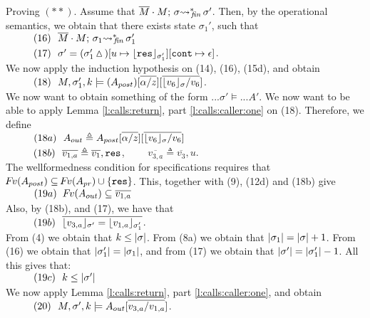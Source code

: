 \begin{description}
 \vspace{.3cm}
Proving $(**)$. Assume that   $\leadstoBoundedStarFin  {\Mtwo\cdot M}  {\sigma}  {\sigma'}$. Then, by the operational semantics, we obtain that 
there exists state $\sigma_1'$, such that \\
$\SPS (16) \ \ \leadstoBoundedStarFin  {\Mtwo\cdot M}  {\sigma_1}  {\sigma_1'}$ \\
$\SPS (17) \ \ \sigma'=(\sigma_1'\popSymbol)[u \mapsto {\interpret {\sigma_1'} {\prg{res}}}][\prg{cont}\mapsto \epsilon]$.
\\
We now apply the induction hypothesis on (14), (16), (15d), and obtain
\\ 
$\SPS (18) \ \  \satDAssertFrom M  {\sigma_1'} {k}   {(A_{post})[\overline{\alpha/z}][\overline{\interpret {\sigma} {v_6} /v_6}]}$.
\\
We now want to obtain something of the form $...\sigma' \models ...A'$. We now want to be able to apply   Lemma \ref{l:calls:return},  part \ref{l:calls:caller:one} on (18). Therefore, we  define
\\
$\SPS (18a) \ \  \Aout \triangleq  A_{post}[\overline{\alpha/z}][\overline{\interpret {\sigma} {v_6} /v_6}]$
\\
$\SPS (18b) \ \  \overline {v_{1,a}} \triangleq  \overline {v_1}, \prg{res}$,   \ \ \ \ 
$\overline {v_{3,a}} \triangleq  \overline {v_3}, u$.
\\
The wellformedness condition for specifications requires that $\fv (A_{post}) \subseteq  \fv (\Aop) \cup \{ \prg{res} \}$. 
This, together with  (9), (12d) and (18b) give  \\
$\SPS (19a) \ \  \fv(\Aout) \subseteq  \overline {v_{1,a}}$
\\
Also, by (18b), and (17), we have that   
\\
$\SPS (19b) \ \ \overline {\interpret {\sigma'} {v_{3,a}}  =  \interpret {\sigma_1'} {v_{1,a}} }$.
\\
From (4) we obtain that  $ k \leq \DepthSt {\sigma}$. From  (8a) we obtain that $ \DepthSt {\sigma_1} = \DepthSt {\sigma} +1$. From (16) we obtain that  $ \DepthSt {\sigma_1'} = \DepthSt {\sigma_1}$, and from (17) we obtain that $ \DepthSt {\sigma'} = \DepthSt {\sigma_1'} -1$. All this gives that:\\
$\SPS (19c) \ \ k \leq \DepthSt {\sigma'}$
\\
We now apply  Lemma \ref{l:calls:return},  part \ref{l:calls:caller:one}, and obtain  
\\
$\SPS (20) \ \  \satDAssertFrom M  {\sigma'} {k}   {\Aout[\overline{v_{3,a}/v_{1,a}}]}$.

\end{description}
